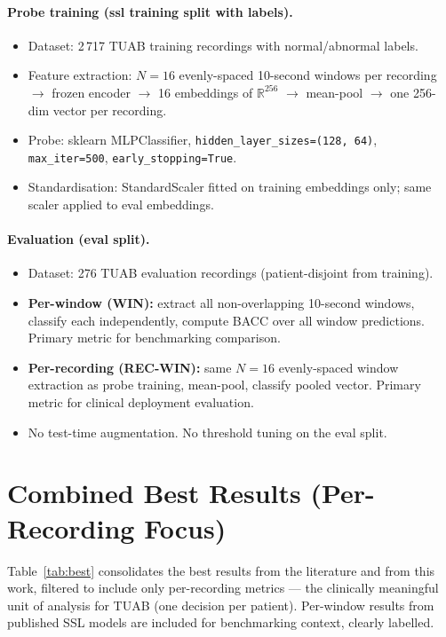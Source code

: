 \documentclass[11pt,a4paper]{article}
\begin{document}
\paragraph{Probe training (ssl training split with labels).}
\begin{itemize}[noitemsep]
  \item Dataset: 2\,717 TUAB training recordings with normal/abnormal labels.
  \item Feature extraction: $N{=}16$ evenly-spaced 10-second windows per recording
    $\to$ frozen encoder $\to$ 16 embeddings of $\mathbb{R}^{256}$
    $\to$ mean-pool $\to$ one 256-dim vector per recording.
  \item Probe: sklearn MLPClassifier, \texttt{hidden\_layer\_sizes=(128, 64)},
    \texttt{max\_iter=500}, \texttt{early\_stopping=True}.
  \item Standardisation: StandardScaler fitted on training embeddings only;
    same scaler applied to eval embeddings.
\end{itemize}

\paragraph{Evaluation (eval split).}
\begin{itemize}[noitemsep]
  \item Dataset: 276 TUAB evaluation recordings (patient-disjoint from training).
  \item \textbf{Per-window (WIN):} extract all non-overlapping 10-second windows,
    classify each independently, compute BACC over all window predictions.
    Primary metric for benchmarking comparison.
  \item \textbf{Per-recording (REC-WIN):} same $N{=}16$ evenly-spaced window
    extraction as probe training, mean-pool, classify pooled vector.
    Primary metric for clinical deployment evaluation.
  \item No test-time augmentation. No threshold tuning on the eval split.
\end{itemize}

\section{Combined Best Results (Per-Recording Focus)}
\label{sec:best}

Table~\ref{tab:best} consolidates the best results from the literature and
from this work, filtered to include only per-recording metrics --- the clinically
meaningful unit of analysis for TUAB (one decision per patient).
Per-window results from published SSL models are included for benchmarking
context, clearly labelled.
\end{document}
